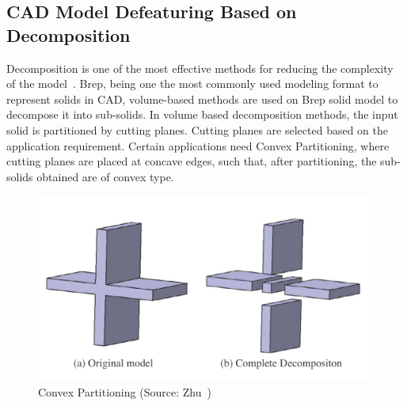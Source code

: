 	

\subsection{CAD Model Defeaturing Based on Decomposition}

Decomposition is one of the most effective methods for reducing the complexity of the model~\cite{Zhu2015}. Brep, being one the most commonly used modeling format to represent solids in CAD, volume-based methods are used on Brep solid model to decompose it into sub-solids. In volume based decomposition methods, the input solid is partitioned by cutting planes. Cutting planes are selected based on the application requirement. Certain applications need Convex Partitioning, where cutting planes are placed at concave edges, such that, after partitioning, the sub-solids obtained are of convex type. 


	\begin{figure} [!h]
		\centering
		\includegraphics[width=0.6\linewidth]{images/zhudecomp}
		\caption{Convex Partitioning (Source: Zhu~\cite{Zhu2016})}
		\label{fig:introduction:zhudecomp}
	\end{figure} 

